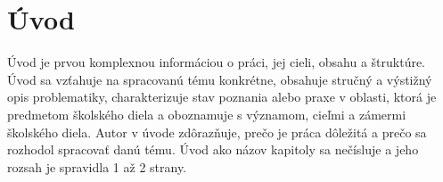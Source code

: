 \chapter*{Úvod}

Úvod je prvou komplexnou informáciou o práci, jej cieli, obsahu a štruktúre. Úvod sa 
vzťahuje na spracovanú tému konkrétne, obsahuje stručný a výstižný opis 
problematiky, charakterizuje stav poznania alebo praxe v oblasti, ktorá je predmetom 
školského diela a oboznamuje s významom, cieľmi a zámermi školského diela. Autor 
v úvode zdôrazňuje, prečo je práca dôležitá a prečo sa rozhodol spracovať danú tému. 
Úvod ako názov kapitoly sa nečísluje a jeho rozsah je spravidla 1 až 2 strany.
